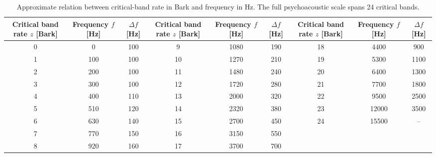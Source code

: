 \begin{table}[!htbp]
    \centering
    \caption{Approximate relation between critical-band rate in Bark and frequency in Hz. The full psychoacoustic scale spans 24 critical bands.}
    \label{tab:bark_table}
    \setlength{\tabcolsep}{4.6pt}
    \fontsize{11pt}{13pt}\selectfont
    \renewcommand{\arraystretch}{1.18}
    \begin{tabular}{ccc@{\hspace{8pt}}ccc@{\hspace{8pt}}ccc}
        \toprule
        \makecell[c]{\textbf{Critical}\\[1pt]\textbf{band rate}\\[1pt]\textbf{$z$ [Bark]}} &
        \makecell[c]{\textbf{Frequency}\\[1pt]\textbf{$f$ [Hz]}} &
        \makecell[c]{\textbf{$\Delta f$}\\[1pt]\textbf{[Hz]}} &
        \makecell[c]{\textbf{Critical}\\[1pt]\textbf{band rate}\\[1pt]\textbf{$z$ [Bark]}} &
        \makecell[c]{\textbf{Frequency}\\[1pt]\textbf{$f$ [Hz]}} &
        \makecell[c]{\textbf{$\Delta f$}\\[1pt]\textbf{[Hz]}} &
        \makecell[c]{\textbf{Critical}\\[1pt]\textbf{band rate}\\[1pt]\textbf{$z$ [Bark]}} &
        \makecell[c]{\textbf{Frequency}\\[1pt]\textbf{$f$ [Hz]}} &
        \makecell[c]{\textbf{$\Delta f$}\\[1pt]\textbf{[Hz]}} \\
        \midrule
        0 & 0    & 100 & 9  & 1080  & 190 & 18 & 4400  & 900  \\
        1 & 100  & 100 & 10 & 1270  & 210 & 19 & 5300  & 1100 \\
        2 & 200  & 100 & 11 & 1480  & 240 & 20 & 6400  & 1300 \\
        3 & 300  & 100 & 12 & 1720  & 280 & 21 & 7700  & 1800 \\
        4 & 400  & 110 & 13 & 2000  & 320 & 22 & 9500  & 2500 \\
        5 & 510  & 120 & 14 & 2320  & 380 & 23 & 12000 & 3500 \\
        6 & 630  & 140 & 15 & 2700  & 450 & 24 & 15500 & --   \\
        7 & 770  & 150 & 16 & 3150  & 550 &    &       &      \\
        8 & 920  & 160 & 17 & 3700  & 700 &    &       &      \\
        \bottomrule
    \end{tabular}
\end{table}

